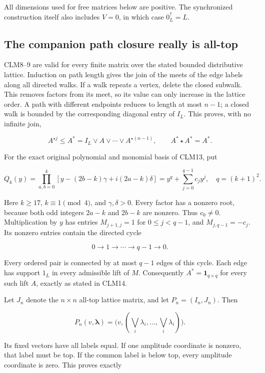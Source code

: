 \documentclass[11pt]{article}
\begin{document}
All dimensions used for free matrices below are positive. The synchronized construction itself also includes \(V=0\), in which case \(0^\uparrow_L=L\).

\subsection{The companion path closure really is all-top}

CLM8--9 are valid for every finite matrix over the stated bounded distributive lattice. Induction on path length gives the join of the meets of the edge labels along all directed walks. If a walk repeats a vertex, delete the closed subwalk. This removes factors from its meet, so its value can only increase in the lattice order. A path with different endpoints reduces to length at most \(n-1\); a closed walk is bounded by the corresponding diagonal entry of \(I_L\). This proves, with no infinite join,

\[
A^{\star j}\le A^*=I_L\vee A\vee\cdots\vee A^{\star(n-1)},\qquad
A^*\star A^*=A^*.
\tag{CR4}
\]

For the exact original polynomial and monomial basis of CLM13, put

\[
Q_k(y)=\prod_{a,b=0}^k[y-(2b-k)\gamma+i(2a-k)\delta]
      =y^q+\sum_{j=0}^{q-1}c_jy^j,
\quad q=(k+1)^2.
\tag{CR5}
\]

Here \(k\ge17\), \(k\equiv1\pmod4\), and \(\gamma,\delta>0\). Every factor has a nonzero root, because both odd integers \(2a-k\) and \(2b-k\) are nonzero. Thus \(c_0\ne0\). Multiplication by \(y\) has entries \(M_{j+1,j}=1\) for \(0\le j<q-1\), and \(M_{j,q-1}=-c_j\). Its nonzero entries contain the directed cycle

\[
0\longrightarrow1\longrightarrow\cdots\longrightarrow q-1
 \longrightarrow0.
\tag{CR6}
\]

Every ordered pair is connected by at most \(q-1\) edges of this cycle. Each edge has support \(1_L\) in every admissible lift of \(M\). Consequently \(A^*=\mathbf1_{q\times q}\) for every such lift \(A\), exactly as stated in CLM14.

Let \(J_n\) denote the \(n\times n\) all-top lattice matrix, and let \(P_n=(I_n,J_n)\). Then

\[
P_n(v,\boldsymbol\lambda)=
\bigl(v,(\bigvee_i\lambda_i,\ldots,\bigvee_i\lambda_i)\bigr).
\tag{CR7}
\]

Its fixed vectors have all labels equal. If one amplitude coordinate is nonzero, that label must be top. If the common label is below top, every amplitude coordinate is zero. This proves exactly
\end{document}
